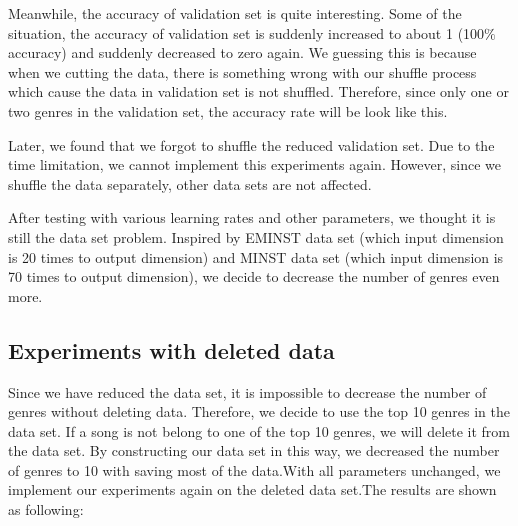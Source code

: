 \documentclass{article}
\begin{document}
Meanwhile, the accuracy of validation set is quite interesting. Some of the situation, the accuracy of validation set is suddenly increased to about 1 (100$\%$ accuracy) and suddenly decreased to zero again. We guessing this is because when we cutting the data, there is something wrong with our shuffle process which cause the data in validation set is not shuffled. Therefore, since only one or two genres in the validation set, the accuracy rate will be look like this.

Later, we found that we forgot to shuffle the reduced validation set. Due to the time limitation, we cannot implement this experiments again. However, since we shuffle the data separately, other data sets are not affected.

After testing with various learning rates and other parameters, we thought it is still the data set problem. Inspired by EMINST data set (which input dimension is 20 times to output dimension) and MINST data set (which input dimension is 70 times to output dimension), we decide to decrease the number of genres even more.

\subsection{Experiments with deleted data}
Since we have reduced the data set, it is impossible to decrease the number of genres without deleting data. Therefore, we decide to use the top 10 genres in the data set. If a song is not belong to one of the top 10 genres, we will delete it from the data set. By constructing our data set in this way, we decreased the number of genres to 10 with saving most of the data.With all parameters unchanged, we implement our experiments again on the deleted data set.The results are shown as following:
\end{document}
